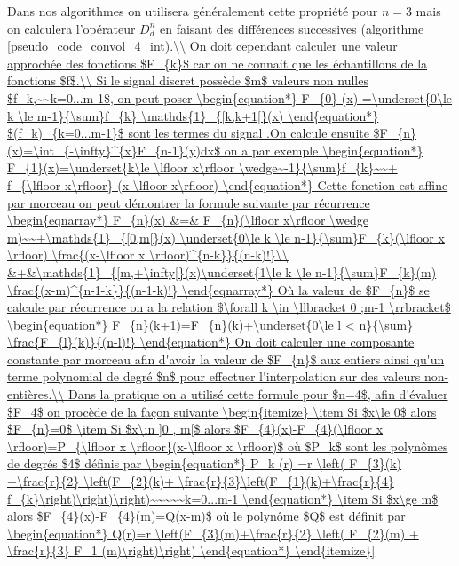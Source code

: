 Dans nos algorithmes  on utilisera généralement cette propriété pour $n=3$ mais on calculera l'opérateur $D_d^n$ en faisant des différences successives (algorithme \ref{pseudo_code_convol_4_int).\\ 


On doit cependant calculer une valeur approchée des fonctions $F_{k}$  car on ne connait que les échantillons de la fonctions $f$.\\
Si le signal discret possède $m$ valeurs non nulles $f_k,~~k=0...m-1$, on peut poser 
\begin{equation*}
F_{0} (x) =\underset{0\le k \le m-1}{\sum}f_{k} \mathds{1}_{[k,k+1[}(x)
\end{equation*}

$(f_k)_{k=0...m-1}$ sont les termes du signal .On calcule ensuite $F_{n}(x)=\int_{-\infty}^{x}F_{n-1}(y)dx$ on a par exemple
\begin{equation*}
F_{1}(x)=\underset{k\le \lfloor x\rfloor \wedge~-1}{\sum}f_{k}~~+ f_{\lfloor x\rfloor}
(x-\lfloor x\rfloor)
\end{equation*}
Cette fonction est affine par morceau on peut démontrer la formule suivante par récurrence
\begin{eqnarray*}
F_{n}(x) &=& F_{n}(\lfloor x\rfloor \wedge m)~~+\mathds{1}_{[0,m[}(x) \underset{0\le k \le n-1}{\sum}F_{k}(\lfloor x \rfloor) \frac{(x-\lfloor x \rfloor)^{n-k}}{(n-k)!}\\
          &+&\mathds{1}_{[m,+\infty[}(x)\underset{1\le k \le n-1}{\sum}F_{k}(m) \frac{(x-m)^{n-1-k}}{(n-1-k)!}
\end{eqnarray*}
Où la valeur de $F_{n}$ se calcule par récurrence on a la relation $\forall k \in \llbracket 0 ;m-1 \rrbracket$
\begin{equation*}
F_{n}(k+1)=F_{n}(k)+\underset{0\le l < n}{\sum} \frac{F_{l}(k)}{(n-l)!}
\end{equation*}
On doit calculer une composante constante par morceau afin d'avoir la valeur de $F_{n}$ aux entiers  ainsi qu'un terme polynomial de degré $n$ pour effectuer l'interpolation sur des valeurs non-entières.\\
Dans la pratique on a utilisé cette formule pour $n=4$, afin d'évaluer $F_4$ on procède de la façon suivante 
\begin{itemize}
\item Si $x\le 0$ alors $F_{n}=0$
\item Si $x\in ]0 , m[$ alors $F_{4}(x)-F_{4}(\lfloor x \rfloor)=P_{\lfloor x \rfloor}(x-\lfloor x \rfloor)$ où $P_k$ sont les polynômes de degrés $4$ définis par
\begin{equation*}
P_k (r) =r \left( F_{3}(k) +\frac{r}{2} \left(F_{2}(k)+ \frac{r}{3}\left(F_{1}(k)+\frac{r}{4} f_{k}\right)\right)\right)~~~~~k=0...m-1
\end{equation*}
\item Si $x\ge m$ alors $F_{4}(x)-F_{4}(m)=Q(x-m)$ où le polynôme $Q$ est définit par
\begin{equation*}
Q(r)=r \left(F_{3}(m)+\frac{r}{2} \left( F_{2}(m) + \frac{r}{3} F_1 (m)\right)\right)
\end{equation*}


\end{itemize}}
